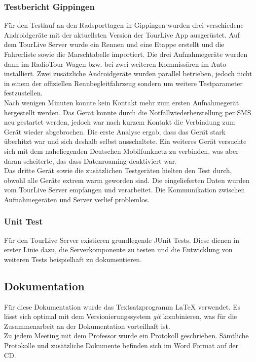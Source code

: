 \subsubsection{Testbericht Gippingen}
Für den Testlauf an den Radsporttagen in Gippingen wurden drei verschiedene Androidgeräte mit der aktuellsten Version der TourLive App ausgerüstet. Auf dem TourLive Server wurde ein Rennen und eine Etappe erstellt und die Fahrerliste sowie die Marschtabelle importiert. Die drei Aufnahmegeräte wurden dann im RadioTour Wagen bzw. bei zwei weiteren Kommissären im Auto installiert. Zwei zusätzliche Androidgeräte wurden parallel betrieben, jedoch nicht in einem der offiziellen Rennbegleitfahrzeug sondern um weitere Testparameter festzustellen.
\\

Nach wenigen Minuten konnte kein Kontakt mehr zum ersten Aufnahmegerät hergestellt werden. Das Gerät konnte durch die Notfallwiederherstellung per SMS neu gestartet werden, jedoch war nach kurzem Kontakt die Verbindung zum Gerät wieder abgebrochen. Die erste Analyse ergab, dass das Gerät stark überhitzt war und sich deshalb selbst ausschaltete. Ein weiteres Gerät versuchte sich mit dem naheliegenden Deutschen Mobilfunknetz zu verbinden, was aber daran scheiterte, das dass Datenroaming deaktiviert war.
\\

Das dritte Gerät sowie die zusätzlichen Testgeräten hielten den Test durch, obwohl alle Geräte extrem warm geworden sind. Die eingelieferten Daten wurden vom TourLive Server empfangen und verarbeitet. Die Kommunikation zwischen Aufnahmegeräten und Server verlief problemlos.

\subsubsection{Unit Test}
Für den TourLive Server existieren grundlegende JUnit Tests. Diese dienen in erster Linie dazu, die Serverkomponente zu testen und die Entwicklung von weiteren Tests beispielhaft zu dokumentieren.

\subsection{Dokumentation}
Für diese Dokumentation wurde das Textsatzprogramm {\LaTeX} verwendet. Es lässt sich optimal mit dem Versionierungssystem \textit{\gls{git}} kombinieren, was für die Zusammenarbeit an der Dokumentation vorteilhaft ist.
\\

Zu jedem Meeting mit dem Professor wurde ein Protokoll geschrieben. Sämtliche Protokolle und zusätzliche Dokumente befinden sich im Word Format auf der CD.